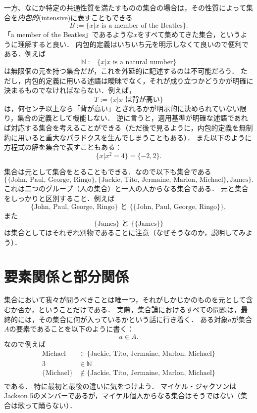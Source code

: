 \documentclass[11pt,a4paper]{jsarticle}
\begin{document}
一方、なにか特定の共通性質を満たすものの集合の場合は，その性質によって集合を\emph{内包的}(intensive)に表すこともできる
\[
 B := \{x | x \text{ is a member of the Beatles}\}.
\]
「a member of the Beatles」であるような$x$をすべて集めてきた集合，というように理解すると良い．
内包的定義はいちいち元を明示しなくて良いので便利である．例えば
\[
 \mathbb{N} := \{x | x \text{ is a natural number}\}
\]
は無限個の元を持つ集合だが，これを外延的に記述するのは不可能だろう．
ただし，内包的定義に用いる述語は曖昧でなく，それが成り立つかどうかが明確に決まるものでなければならない．例えば，
\[
 T := \{x | x \text{ は背が高い}\}
\]
は，何センチ以上なら「背が高い」とされるかが明示的に決められていない限り，集合の定義として機能しない．
逆に言うと，適用基準が明確な述語であれば対応する集合を考えることができる（ただ後で見るように，内包的定義を無制約に用いると重大なパラドクスを生んでしまうこともある）．
また以下のように方程式の解を集合で表すこともある：
\[
 \{ x | x^2 = 4\} = \{ -2, 2 \}.
\]


集合は元として集合をとることもできる．なので以下も集合である
\[
\{ \{\text{John, Paul, George, Ringo}\}, \{ \text{Jackie, Tito, Jermaine, Marlon, Michael}\}, \text{James} \}.
\]
これは二つのグループ（人の集合）と一人の人からなる集合である．
元と集合をしっかりと区別すること．例えば
\[
\{\text{John, Paul, George, Ringo}\} \text{ と } \{ \{\text{John, Paul, George, Ringo}\} \},
\]
また
\[
\{\text{James}\} \text{ と } \{ \{\text{James}\} \}  
\]
は集合としてはそれぞれ別物であることに注意（なぜそうなのか，説明してみよう）．




\section{要素関係と部分関係}
集合において我々が問うべきことは唯一つ，それがしかじかのものを元として含むか否か，ということだけである．
実際，集合論におけるすべての問題は，最終的には，その集合に何が入っているかという話に行き着く．
ある対象$a$が集合$A$の要素であることを以下のように書く：
\[
 a \in A.
\]
なので例えば
\begin{align*}
\text{Michael} &\in \{ \text{Jackie, Tito, Jermaine, Marlon, Michael}\}  \\
3 &\in \mathbb{N} \\
\{ \text{Michael} \} &\not\in \{ \text{Jackie, Tito, Jermaine, Marlon, Michael}\}  \\
\end{align*}
である．
特に最初と最後の違いに気をつけよう．
マイケル・ジャクソンはJackson 5のメンバーであるが，マイケル個人からなる集合はそうではない（集合は歌って踊らない）．
\end{document}
